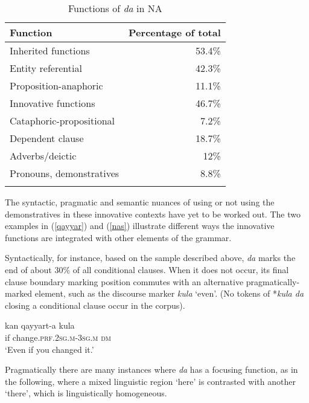 \documentclass[output=paper]{langsci/langscibook}
\begin{document}
\begin{table}\begin{tabularx}{.67\textwidth}{lr}
\lsptoprule
Function & Percentage of total\\
\midrule
Inherited functions &  53.4\%\\
        \hspace{5mm}Entity referential  & 42.3\%\\
        \hspace{5mm}Proposition-anaphoric  & 11.1\%\\
\addlinespace
Innovative functions & 46.7\%\\
        \hspace{5mm}Cataphoric-propositional & 7.2\%\\
        \hspace{5mm}Dependent clause & 18.7\%\\
        \hspace{5mm}Adverbs/deictic & 12\%\\
        \hspace{5mm}Pronouns, {demonstratives} & 8.8\%\\
\lspbottomrule
\end{tabularx}
\caption{
\label{bkm:Ref520915528}Functions of \textit{da} in NA
}
\label{tab:funct}
\end{table}


The syntactic, pragmatic and semantic nuances of using or not using the dem\-onstratives in these innovative contexts have yet to be worked out. The two examples in (\ref{qayyar}) and (\ref{nas}) illustrate different ways the innovative functions are integrated with other elements of the grammar.

Syntactically, for instance, based on the sample described above, \textit{da} marks the end of about 30\% of all {conditional} clauses. When it does not occur, its final clause boundary marking position commutes with an alternative pragmatically-marked element, such as the discourse marker \textit{kula} ‘even’. (No tokens of *\textit{kula da} closing a {conditional} clause occur in the corpus).

\ea\label{qayyar}
\gll kan qayyart-a kula\\
     if change.\textsc{prf.2sg.m-3sg.m} \textsc{dm}\\
\glt ‘Even if you changed it.’
\z

Pragmatically there are many instances where \textit{da} has a {focusing} function, as in the following, where a mixed linguistic region ‘here’ is contrasted with another ‘there’, which is linguistically homogeneous.
\end{document}
